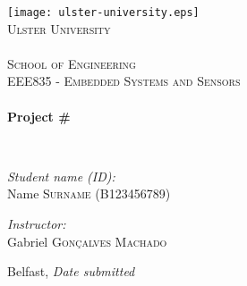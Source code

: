 \documentclass[12pt,a4paper]{article}
\begin{document}
\begin{titlepage}
\begin{center}

\texttt{[image: ulster-university.eps]}~\\[1cm]

\textsc{\LARGE Ulster University \\ \ \\ School of Engineering}\\[1.5cm]

\textsc{\Large EEE835 - Embedded Systems and Sensors}\\[0.5cm]

\HRule \\[0.4cm]
{ \huge \bfseries Project \#\\[0.4cm] }

\HRule \\[1.5cm]
\end{center}
\begin{minipage}{0.4\textwidth}
\begin{flushleft} \large
\emph{Student name (ID):}\\
Name \textsc{Surname} (B123456789) \\
\end{flushleft}
\end{minipage}
\begin{minipage}[b]{0.4\textwidth}
\begin{flushright} \large
\emph{Instructor:} \\
Gabriel  \textsc{Gon\c{c}alves Machado}
\end{flushright}
\end{minipage}

\vfill

\begin{center}
{\large Belfast, \textit{Date submitted}}
\end{center}

\end{titlepage}

\clearpage



\end{document}
